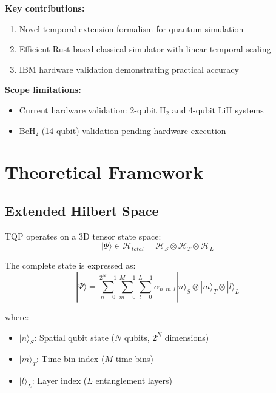 \documentclass[aps,prx,twocolumn,superscriptaddress,floatfix]{revtex4-2}
\begin{document}
\textbf{Key contributions:}
\begin{enumerate}
    \item Novel temporal extension formalism for quantum simulation
    \item Efficient Rust-based classical simulator with linear temporal scaling
    \item IBM hardware validation demonstrating practical accuracy
\end{enumerate}

\textbf{Scope limitations:}
\begin{itemize}
    \item Current hardware validation: 2-qubit H$_2$ and 4-qubit LiH systems
    \item BeH$_2$ (14-qubit) validation pending hardware execution
\end{itemize}

\section{Theoretical Framework}

\subsection{Extended Hilbert Space}

TQP operates on a 3D tensor state space:
\begin{equation}
    |\Psi\rangle \in \mathcal{H}_{total} = \mathcal{H}_S \otimes \mathcal{H}_T \otimes \mathcal{H}_L
\end{equation}

The complete state is expressed as:
\begin{equation}
    |\Psi\rangle = \sum_{n=0}^{2^N-1} \sum_{m=0}^{M-1} \sum_{l=0}^{L-1} \alpha_{n,m,l} |n\rangle_S \otimes |m\rangle_T \otimes |l\rangle_L
\end{equation}

where:
\begin{itemize}
    \item $|n\rangle_S$: Spatial qubit state ($N$ qubits, $2^N$ dimensions)
    \item $|m\rangle_T$: Time-bin index ($M$ time-bins)
    \item $|l\rangle_L$: Layer index ($L$ entanglement layers)
\end{itemize}
\end{document}
